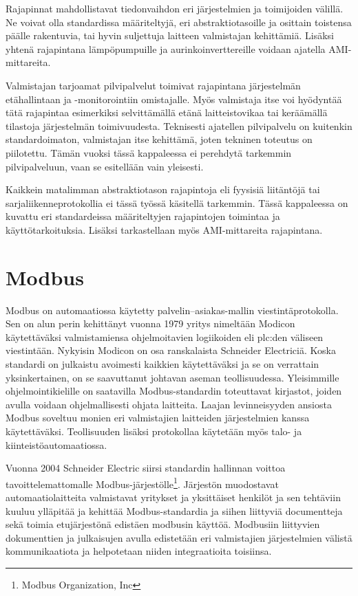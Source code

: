 Rajapinnat mahdollistavat tiedonvaihdon eri järjestelmien ja toimijoiden välillä. Ne voivat olla standardissa määriteltyjä, eri abstraktiotasoille ja osittain toistensa päälle rakentuvia, tai hyvin suljettuja laitteen valmistajan kehittämiä. Lisäksi yhtenä rajapintana lämpöpumpuille ja aurinkoinverttereille voidaan ajatella AMI-mittareita.

Valmistajan tarjoamat pilvipalvelut toimivat rajapintana järjestelmän etähallintaan ja -monitorointiin omistajalle. Myös valmistaja itse voi hyödyntää tätä rajapintaa esimerkiksi selvittämällä etänä laitteistovikaa tai keräämällä tilastoja järjestelmän toimivuudesta. Teknisesti ajatellen pilvipalvelu on kuitenkin standardoimaton, valmistajan itse kehittämä, joten tekninen toteutus on piilotettu. Tämän vuoksi tässä kappaleessa ei perehdytä tarkemmin pilvipalveluun, vaan se esitellään vain yleisesti.

Kaikkein matalimman abstraktiotason rajapintoja eli fyysisiä liitäntöjä tai sarjaliikenneprotokollia ei tässä työssä käsitellä tarkemmin. Tässä kappaleessa on kuvattu eri standardeissa määriteltyjen rajapintojen toimintaa ja käyttötarkoituksia. Lisäksi tarkastellaan myös \gls{AMI}-mittareita rajapintana.

\section{Modbus}

  Modbus on automaatiossa käytetty palvelin--asiakas-mallin viestintäprotokolla. Sen on alun perin kehittänyt vuonna 1979 yritys nimeltään Modicon käytettäväksi valmistamiensa ohjelmoitavien logiikoiden eli \Gls{plc}:den väliseen viestintään. Nykyisin Modicon on osa ranskalaista Schneider Electriciä. Koska standardi on julkaistu avoimesti kaikkien käytettäväksi ja se on verrattain yksinkertainen, on se saavuttanut johtavan aseman teollisuudessa. Yleisimmille ohjelmointikielille on saatavilla Modbus-standardin toteuttavat kirjastot, joiden avulla voidaan ohjelmallisesti ohjata laitteita. Laajan levinneisyyden ansiosta Modbus soveltuu monien eri valmistajien laitteiden järjestelmien kanssa käytettäväksi. Teollisuuden lisäksi protokollaa käytetään myös talo- ja kiinteistöautomaatiossa.\parencite{sousaPortugal, modbusAppSpec, modbusOrg}

  Vuonna 2004 Schneider Electric siirsi standardin hallinnan voittoa tavoittelemattomalle Modbus-järjestölle\footnote{Modbus Organization, Inc}. Järjestön muodostavat automaatiolaitteita valmistavat yritykset ja yksittäiset henkilöt ja sen tehtäviin kuuluu ylläpitää ja kehittää Modbus-standardia ja siihen liittyviä documentteja sekä toimia etujärjestönä edistäen modbusin käyttöä. Modbusiin liittyvien dokumenttien ja julkaisujen avulla edistetään eri valmistajien järjestelmien välistä kommunikaatiota ja helpotetaan niiden integraatioita toisiinsa.  \parencite{modbusOrg}

